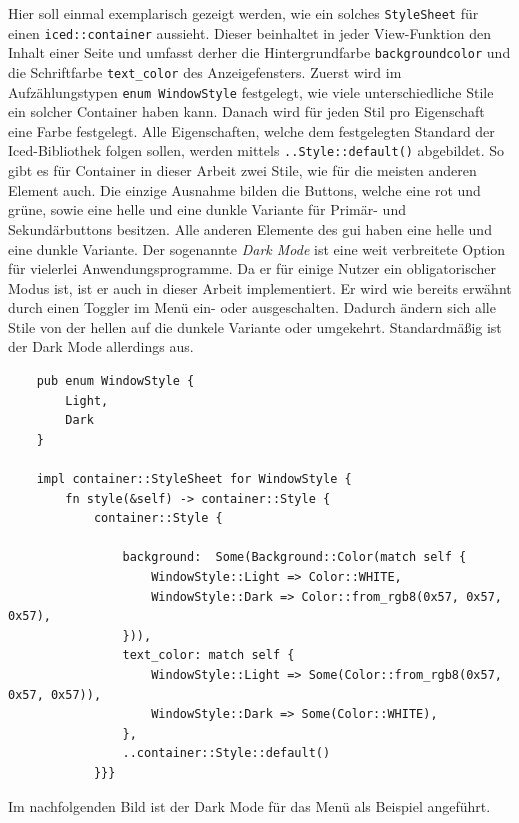 Hier soll einmal exemplarisch gezeigt werden, wie ein solches \lstinline{StyleSheet} für einen \lstinline{iced::container} aussieht. Dieser beinhaltet in jeder View-Funktion den Inhalt einer Seite 
und umfasst derher die Hintergrundfarbe \lstinline{backgroundcolor} und die Schriftfarbe \lstinline{text_color} des Anzeigefensters. 
Zuerst wird im Aufzählungstypen \lstinline{enum WindowStyle} festgelegt, wie viele unterschiedliche Stile ein solcher Container haben kann. 
Danach wird für jeden Stil pro Eigenschaft eine Farbe festgelegt. Alle Eigenschaften, welche dem festgelegten Standard der Iced-Bibliothek folgen sollen, werden mittels 
\lstinline{..Style::default()} abgebildet. So gibt es für Container in dieser Arbeit zwei Stile, wie für die meisten anderen Element auch. Die einzige Ausnahme bilden die Buttons, welche eine rot und grüne, 
sowie eine helle und eine dunkle Variante für Primär- und Sekundärbuttons besitzen. 
Alle anderen Elemente des \ac{gui} haben eine helle und eine dunkle Variante. Der sogenannte \emph{Dark Mode} ist eine weit verbreitete Option für vielerlei Anwendungsprogramme. Da er für einige Nutzer ein obligatorischer Modus ist,
ist er auch in dieser Arbeit implementiert. Er wird wie bereits erwähnt durch einen Toggler im Menü ein- oder ausgeschalten. Dadurch ändern sich alle Stile von der hellen auf die dunkele Variante oder umgekehrt. 
Standardmäßig ist der Dark Mode allerdings aus.

\begin{lstlisting}
    pub enum WindowStyle {
        Light,
        Dark
    }

    impl container::StyleSheet for WindowStyle {
        fn style(&self) -> container::Style {
            container::Style { 
                
                background:  Some(Background::Color(match self {
                    WindowStyle::Light => Color::WHITE,
                    WindowStyle::Dark => Color::from_rgb8(0x57, 0x57, 0x57),
                })),
                text_color: match self {
                    WindowStyle::Light => Some(Color::from_rgb8(0x57, 0x57, 0x57)),
                    WindowStyle::Dark => Some(Color::WHITE),
                },
                ..container::Style::default()
            }}}

\end{lstlisting}

Im nachfolgenden Bild ist der Dark Mode für das Menü als Beispiel angeführt.

